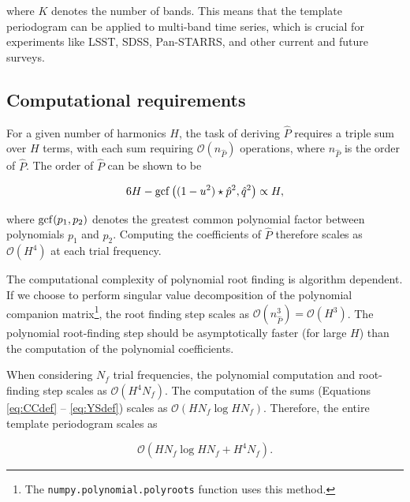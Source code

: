 \documentclass[iop]{emulateapj}
\newcommand{\bigO}{\mathcal{O}}
\begin{document}
\noindent where $K$ denotes the number of bands. This means that the template
periodogram can be applied to multi-band time series, which is crucial for
experiments like LSST, SDSS, Pan-STARRS, and other current and future surveys.




\subsection{Computational requirements}

For a given number of harmonics $H$, the task of deriving 
$\hat{P}$ requires a triple sum over $H$ terms, with each sum
requiring $\bigO(n_{\hat{P}})$ operations, where $n_{\hat{P}}$ is the order
of $\hat{P}$. The order of $\hat{P}$ can be shown to be

\begin{equation}
6H - {\rm gcf}\left((1 - u^2)\star\hat{p}^2, \hat{q}^2\right) \propto H,
\end{equation}

\noindent where ${\rm gcf}(p_1, p_2)$ denotes the greatest common polynomial factor
between polynomials $p_1$ and $p_2$. Computing the coefficients of $\hat{P}$ therefore
scales as $\bigO(H^4)$ at each trial frequency. 

The computational complexity of polynomial root finding
is algorithm dependent. If we choose to perform singular value decomposition of
the polynomial companion matrix\footnote{The \texttt{numpy.polynomial.polyroots} 
function uses this method.}, the root finding step scales as 
$\bigO(n_{\hat{P}}^3) = \bigO(H^3)$. The polynomial root-finding step 
should be asymptotically faster (for large $H$) than the computation of 
the polynomial coefficients.

When considering $N_f$ trial frequencies, the polynomial computation and root-finding 
step scales as $\bigO(H^4N_f)$. The computation of the sums 
(Equations \ref{eq:CCdef} -- \ref{eq:YSdef}) scales as $\bigO(HN_f\log HN_f)$.
Therefore, the entire template periodogram scales as 

\begin{equation}
\bigO(HN_f \log HN_f + H^4N_f).
\end{equation}
\end{document}
